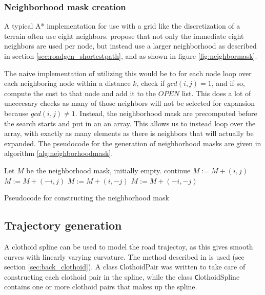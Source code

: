 \subsubsection{Neighborhood mask creation}
A typical A* implementation for use with a grid like the discretization of a terrain often use eight neighbors. \cite{roadgen} propose that not only the immediate eight neighbors are used per node, but instead use a larger neighborhood as described in section \ref{sec:roadgen_shortestpath}, and as shown in figure \ref{fig:neighbormask}. 

The naive implementation of utilizing this would be to for each node loop over each neighboring node within a distance $k$, check if $gcd(i,j)=1$, and if so, compute the cost to that node and add it to the $OPEN$ list. This does a lot of uneccesary checks as many of those neighbors will not be selected for expansion because $gcd(i,j)\neq 1$. Instead, the neighborhood mask are precomputed before the search starts and put in an an array. This allows us to instead loop over the array, with exactly as many elements as there is neighbors that will actually be expanded. The pseudocode for the generation of neighborhood masks are given in algorithm \ref{alg:neighborhoodmask}.

\begin{algorithm}
\begin{algorithmic}
\STATE Let $M$ be the neighborhood mask, initially empty.
            \STATE continue
        \ENDIF
        \STATE $M := M + (i,j)$
            \STATE $M := M + (-i,j)$
            \STATE $M := M + (i,-j)$
            \STATE $M := M + (-i,-j)$
        \ENDIF
    \ENDFOR
\ENDFOR
\end{algorithmic}
\caption{Pseudocode for constructing the neighborhood mask}
\label{alg:neighborhoodmask}
\end{algorithm}

\subsection{Trajectory generation} 
A clothoid spline can be used to model the road trajectoy, as this gives smooth curves with linearly varying curvature. The method described in \cite{clothoid} is used (see section \ref{sec:back_clothoid}). A class {\texttt ClothoidPair} was written to take care of constructing each clothoid pair in the spline, while the class {\texttt ClothoidSpline} contains one or more clothoid pairs that makes up the spline.

